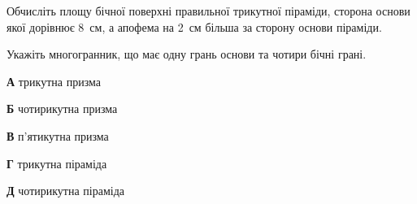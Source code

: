 \documentclass[12pt]{article}
\begin{document}
\begin{samepage}
\noindent\zadnum Обчисліть площу бічної поверхні правильної трикутної піраміди, сторона основи якої дорівнює 8~см, а апофема на 2~см більша за сторону основи піраміди. 

\nmtnobreak
\nopagebreak\nbvspace{0.3cm}
\par{}
\end{samepage}

\begin{samepage}
\noindent\zadnum Укажіть многогранник, що має одну грань основи та чотири бічні грані. 

\nmtnobreak
\nopagebreak\nbvspace{0.3cm}
\noindent
\textbf{А} \quad трикутна призма

\nmtnobreak
\noindent
\textbf{Б} \quad чотирикутна призма

\nmtnobreak
\noindent
\textbf{В} \quad п’ятикутна призма

\nmtnobreak
\noindent
\textbf{Г} \quad трикутна піраміда

\nmtnobreak
\noindent
\textbf{Д} \quad чотирикутна піраміда

\nmtnobreak
\nopagebreak\nbvspace{0.5cm}
\par{}\vspace{0.25cm}
\end{samepage}
\end{document}
